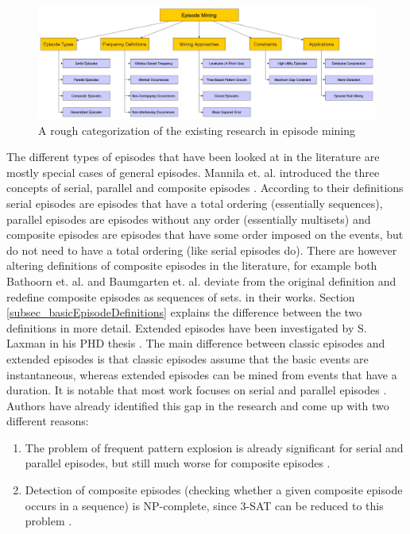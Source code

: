 \begin{figure}[h]
	\centering
  	\includegraphics[width=\textwidth]{episodeOverview}
	\caption{A rough categorization of the existing research in episode mining}
	\label{fig_episodeOverview}
\end{figure}

The different types of episodes that have been looked at in the literature are mostly special cases of general episodes. Mannila et. al. introduced the three concepts of serial, parallel and composite episodes \cite{mannila1995discovering}. According to their definitions serial episodes are episodes that have a total ordering (essentially sequences), parallel episodes are episodes without any order (essentially multisets) and composite episodes are episodes that have some order imposed on the events, but do not need to have a total ordering (like serial episodes do). There are however altering definitions of composite episodes in the literature, for example both Bathoorn et. al. \cite{bathoorn2007finding} and Baumgarten et. al. \cite{baumgarten2003tree} deviate from the original definition and redefine composite episodes as sequences of sets. in their works. Section \ref{subsec_basicEpisodeDefinitions} explains the difference between the two definitions in more detail. Extended episodes have been investigated by S. Laxman in his PHD thesis \cite{laxman2006discovering}. The main difference between classic episodes and extended episodes is that classic episodes assume that the basic events are instantaneous, whereas extended episodes can be mined from events that have a duration. It is notable that most work focuses on serial and parallel episodes \cite{mannila1995discovering} \cite{mannila1997discovery} \cite{laxman2006discovering} \cite{laxman2007fast}. Authors have already identified this gap in the research and come up with two different reasons:
\begin{enumerate}
	\item The problem of frequent pattern explosion is already significant for serial and parallel episodes, but still much worse for composite episodes \cite{bathoorn2007finding}.
	\item Detection of composite episodes (checking whether a given composite episode occurs in a sequence) is NP-complete, since 3-SAT can be reduced to this problem \cite{tatti2011mining}.
\end{enumerate}

